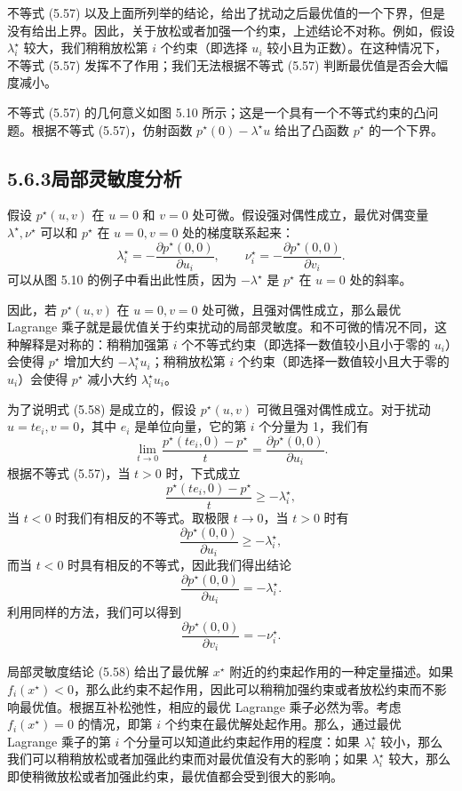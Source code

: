 \documentclass[UTF8,12pt,a4paper,fontset=fandol]{ctexart}
\begin{document}
不等式 (5.57) 以及上面所列举的结论，给出了扰动之后最优值的一个下界，但是没有给出上界。因此，关于放松或者加强一个约束，上述结论不对称。例如，假设 $\lambda_i^\star$ 较大，我们稍稍放松第 $i$ 个约束（即选择 $u_i$ 较小且为正数）。在这种情况下，不等式 (5.57) 发挥不了作用；我们无法根据不等式 (5.57) 判断最优值是否会大幅度减小。

不等式 (5.57) 的几何意义如图 5.10 所示；这是一个具有一个不等式约束的凸问题。根据不等式 (5.57)，仿射函数 $p^\star(0)-\lambda^\star u$ 给出了凸函数 $p^\star$ 的一个下界。

\subsection*{5.6.3\quad 局部灵敏度分析}

假设 $p^\star(u,v)$ 在 $u=0$ 和 $v=0$ 处可微。假设强对偶性成立，最优对偶变量 $\lambda^\star,\nu^\star$ 可以和 $p^\star$ 在 $u=0,v=0$ 处的梯度联系起来：
\begin{equation}
\lambda_i^\star=-\frac{\partial p^\star(0,0)}{\partial u_i},\qquad
\nu_i^\star=-\frac{\partial p^\star(0,0)}{\partial v_i}.
\tag{5.58}
\end{equation}
可以从图 5.10 的例子中看出此性质，因为 $-\lambda^\star$ 是 $p^\star$ 在 $u=0$ 处的斜率。

因此，若 $p^\star(u,v)$ 在 $u=0,v=0$ 处可微，且强对偶性成立，那么最优 Lagrange 乘子就是最优值关于约束扰动的局部灵敏度。和不可微的情况不同，这种解释是对称的：稍稍加强第 $i$ 个不等式约束（即选择一数值较小且小于零的 $u_i$）会使得 $p^\star$ 增加大约 $-\lambda_i^\star u_i$；稍稍放松第 $i$ 个约束（即选择一数值较小且大于零的 $u_i$）会使得 $p^\star$ 减小大约 $\lambda_i^\star u_i$。

为了说明式 (5.58) 是成立的，假设 $p^\star(u,v)$ 可微且强对偶性成立。对于扰动 $u=te_i,v=0$，其中 $e_i$ 是单位向量，它的第 $i$ 个分量为 1，我们有
\[
\lim_{t\to 0}\frac{p^\star(te_i,0)-p^\star}{t}
=\frac{\partial p^\star(0,0)}{\partial u_i}.
\]
根据不等式 (5.57)，当 $t>0$ 时，下式成立
\[
\frac{p^\star(te_i,0)-p^\star}{t}\geq -\lambda_i^\star,
\]
当 $t<0$ 时我们有相反的不等式。取极限 $t\to 0$，当 $t>0$ 时有
\[
\frac{\partial p^\star(0,0)}{\partial u_i}\geq -\lambda_i^\star,
\]
而当 $t<0$ 时具有相反的不等式，因此我们得出结论
\[
\frac{\partial p^\star(0,0)}{\partial u_i}=-\lambda_i^\star.
\]
利用同样的方法，我们可以得到
\[
\frac{\partial p^\star(0,0)}{\partial v_i}=-\nu_i^\star.
\]

局部灵敏度结论 (5.58) 给出了最优解 $x^\star$ 附近的约束起作用的一种定量描述。如果 $f_i(x^\star)<0$，那么此约束不起作用，因此可以稍稍加强约束或者放松约束而不影响最优值。根据互补松弛性，相应的最优 Lagrange 乘子必然为零。考虑 $f_i(x^\star)=0$ 的情况，即第 $i$ 个约束在最优解处起作用。那么，通过最优 Lagrange 乘子的第 $i$ 个分量可以知道此约束起作用的程度：如果 $\lambda_i^\star$ 较小，那么我们可以稍稍放松或者加强此约束而对最优值没有大的影响；如果 $\lambda_i^\star$ 较大，那么即使稍微放松或者加强此约束，最优值都会受到很大的影响。
\end{document}
